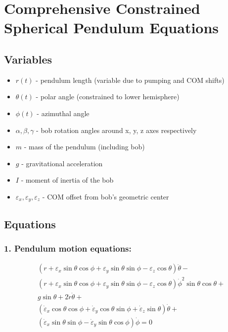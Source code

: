 \documentclass{article}
\begin{document}
\section{Comprehensive Constrained Spherical Pendulum Equations}

\subsection{Variables}
\begin{itemize}
    \item $r(t)$ - pendulum length (variable due to pumping and COM shifts)
    \item $\theta(t)$ - polar angle (constrained to lower hemisphere)
    \item $\phi(t)$ - azimuthal angle
    \item $\alpha, \beta, \gamma$ - bob rotation angles around x, y, z axes respectively
    \item $m$ - mass of the pendulum (including bob)
    \item $g$ - gravitational acceleration
    \item $I$ - moment of inertia of the bob
    \item $\varepsilon_x, \varepsilon_y, \varepsilon_z$ - COM offset from bob's geometric center
\end{itemize}

\subsection{Equations}

\subsubsection{1. Pendulum motion equations:}
\begin{align*}
&(r + \varepsilon_x\sin \theta\cos \phi + \varepsilon_y\sin \theta\sin \phi - \varepsilon_z\cos \theta)\ddot{\theta} - \\
&(r + \varepsilon_x\sin \theta\cos \phi + \varepsilon_y\sin \theta\sin \phi - \varepsilon_z\cos \theta)\dot{\phi}^2\sin \theta\cos \theta + \\
&g\sin \theta + 2\dot{r}\dot{\theta} + \\
&(\dot{\varepsilon}_x\cos \theta\cos \phi + \dot{\varepsilon}_y\cos \theta\sin \phi + \dot{\varepsilon}_z\sin \theta)\dot{\theta} +\\
&(\dot{\varepsilon}_x\sin \theta\sin \phi - \dot{\varepsilon}_y\sin \theta\cos \phi)\dot{\phi} = 0
\end{align*}
\end{document}
